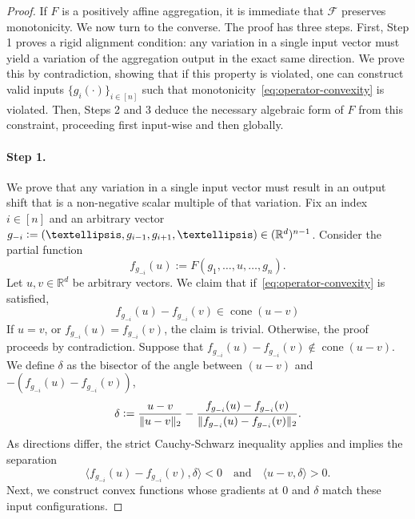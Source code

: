 \documentclass[10pt,a4paper]{amsart}
\newcommand{\F}{\mathcal{F}}
\newcommand{\R}{\mathbb{R}}
\begin{document}
\begin{proof}
    If $F$ is a positively affine aggregation, it is immediate that $\F$ preserves monotonicity.
    We now turn to the converse. 
    The proof has three steps.
    First, Step 1 proves a rigid alignment condition: any variation in a single input vector must yield a variation of the aggregation output in the exact same direction.
    We prove this by contradiction, showing that if this property is violated, one can construct valid inputs $\{g_i(\cdot)\}_{i\in[n]}$ such that monotonicity~\eqref{eq:operator-convexity} is violated.
    Then, Steps 2 and 3 deduce the necessary algebraic form of $F$ from this constraint, proceeding first input-wise and then globally.

    \paragraph{Step 1.} We prove that any variation in a single input vector must result in an output shift that is a non-negative scalar multiple of that variation. 
    Fix an index $i \in [n]$ and an arbitrary vector $g_{-i} \vcentcolon= (\ldots, g_{i-1}, g_{i+1}, \ldots) \in (\R^d)^{n-1}$. 
    Consider the partial function
    \[
        f_{g_{-i}}(u) := F(g_1, \ldots, u, \ldots, g_n).
    \]
    Let $u, v \in \mathbb{R}^d$ be arbitrary vectors. 
    We claim that if~\eqref{eq:operator-convexity} is satisfied,
    \[
        f_{g_{-i}}(u) - f_{g_{-i}}(v) \in \operatorname{cone}(u-v) %
    \] 
    If $u = v$, or $f_{g_{-i}}(u) = f_{g_{-i}}(v)$, the claim is trivial. 
    Otherwise, the proof proceeds by contradiction. Suppose that $f_{g_{-i}}(u) - f_{g_{-i}}(v) \notin \operatorname{cone}(u-v)$.
    We define $\delta$ as the bisector of the angle between $(u-v)$ and $-(f_{g_{-i}}(u) - f_{g_{-i}}(v))$,
    \[
        \delta \vcentcolon= \frac{u-v}{\|u-v\|_2} - \frac{f_{g_{-i}}(u) - f_{g_{-i}}(v)}{\|f_{g_{-i}}(u) - f_{g_{-i}}(v)\|_2}.
    \]
    As directions differ, the strict Cauchy-Schwarz inequality applies and implies the separation 
    \begin{equation}\label{eq:strict_separation}
        \langle f_{g_{-i}}(u) - f_{g_{-i}}(v), \delta \rangle < 0 \quad \text{and} \quad \langle u-v, \delta \rangle > 0.
    \end{equation}
    Next, we construct convex functions whose gradients at $0$ and $\delta$ match these input configurations.

\end{proof}
\end{document}
